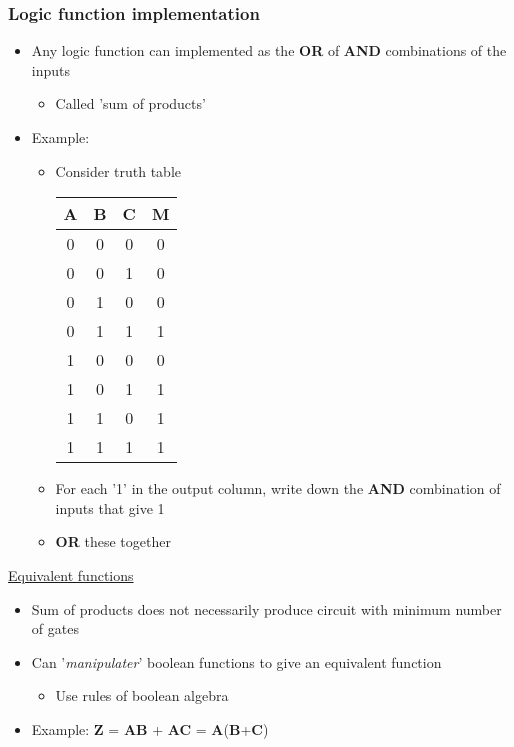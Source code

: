 \documentclass{article}
\begin{document}
\subsubsection{Logic function implementation}

\begin{itemize}
\item Any logic function can implemented as the \textbf{OR} of \textbf{AND} combinations of the inputs
\begin{itemize}
\item Called 'sum of products'
\end{itemize}

\item{Example:}
\begin{itemize}
\item Consider truth table
\begin{tabular}{ c| c| c| c }
 A & B & C & M \\ 
 \hline
 0 & 0 & 0 & 0 \\  
 0 & 0 & 1 & 0 \\  
 0 & 1 & 0 & 0 \\  
 0 & 1 & 1 & 1 \\  
 1 & 0 & 0 & 0 \\  
 1 & 0 & 1 & 1 \\  
 1 & 1 & 0 & 1 \\  
 1 & 1 & 1 & 1 \\  
\end{tabular}
\item For each '1' in the output column, write down the \textbf{AND} combination of inputs that give 1
\item \textbf{OR} these together
\end{itemize}
\end{itemize}

\underline{Equivalent functions}
\begin{itemize}
\item Sum of products does not necessarily produce circuit with minimum number of gates
\item Can '\textit{manipulater}' boolean functions to give an equivalent function
\begin{itemize}
\item Use rules of boolean algebra
\end{itemize}
\item Example: \textbf{Z} = \textbf{AB} + \textbf{AC} = \textbf{A}(\textbf{B}+\textbf{C})
\end{itemize}
\end{document}
